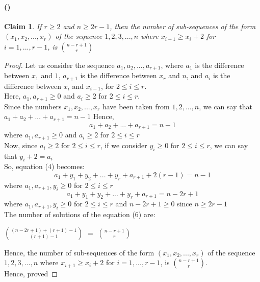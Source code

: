 \documentclass[a4paper]{article}
\newcounter{solution}
\newcounter{subsolution}[solution]
\newcommand{\subsolution}{\paragraph{(\protect\stepcounter{subsolution}\arabic{subsolution})}}
\newtheorem{claim}{Claim}[solution]
\begin{document}
\subsolution{}
\begin{claim}
	If $r \geq 2$ and $n \geq 2r - 1$, then the number of sub-sequences of the form $(x_{1}, x_{2}, ..., x_{r})$ of the sequence $1, 2, 3, ..., n$ where $x_{i + 1} \geq x_{i} + 2$ for $i = 1, ..., r - 1$, is $n - r + 1 \choose r$
\end{claim}
\begin{proof}
	Let us consider the sequence $a_{1}, a_{2}, ..., a_{r+1}$, where $a_{1}$ is the difference between $x_{1}$ and $1$, $a_{r + 1}$ is the difference between $x_{r}$ and $n$, and $a_{i}$ is the difference between $x_{i}$ and $x_{i - 1}$, for $2 \leq i \leq r$.\\
	Here, $a_{1}, a_{r + 1} \geq 0$ and $a_{i} \geq 2$ for $2 \leq i \leq r$.\\
	Since the numbers $x_{1}, x_{2}, ..., x_{r}$ have been taken from $1, 2, ..., n$, we can say that $a_{1} + a_{2} + ... + a_{r + 1} = n - 1$
	Hence,
	\begin{equation}
		a_{1} + a_{2} + ... + a_{r + 1} = n - 1
	\end{equation}
	where $a_{1}, a_{r + 1} \geq 0$ and $a_{i} \geq 2$ for $2 \leq i \leq r$\\
	Now, since $a_{i} \geq 2$ for $2 \leq i \leq r$, if we consider $y_{i} \geq 0$ for $2 \leq i \leq r$, we can say that $y_{i} + 2 = a_{i}$\\
	So, equation (4) becomes:
	\begin{equation}
		a_{1} + y_{1} + y_{2} + ... + y_{r} + a_{r + 1} + 2(r - 1) = n - 1
	\end{equation}
	where $a_{1}, a_{r + 1},y_{i} \geq 0$ for $2 \leq i \leq r$
	\begin{equation}
		a_{1} + y_{1} + y_{2} + ... + y_{r} + a_{r + 1} = n - 2r + 1
	\end{equation}
	where $a_{1}, a_{r + 1},y_{i} \geq 0$ for $2 \leq i \leq r$ and $n - 2r + 1 \geq 0$ since $n \geq 2r - 1$ \\
	The number of solutions of the equation (6) are:
	\begin{center}
		$(n - 2r + 1) + (r + 1) - 1 \choose (r + 1) - 1$ $=$ $n - r + 1 \choose r$
	\end{center}
	Hence, the number of sub-sequences of the form $(x_{1}, x_{2}, ..., x_{r})$ of the sequence $1, 2, 3, ..., n$ where $x_{i + 1} \geq x_{i} + 2$ for $i = 1, ..., r - 1$, is $n - r + 1 \choose r$.\\
	Hence, proved
	
\end{proof}
\end{document}
